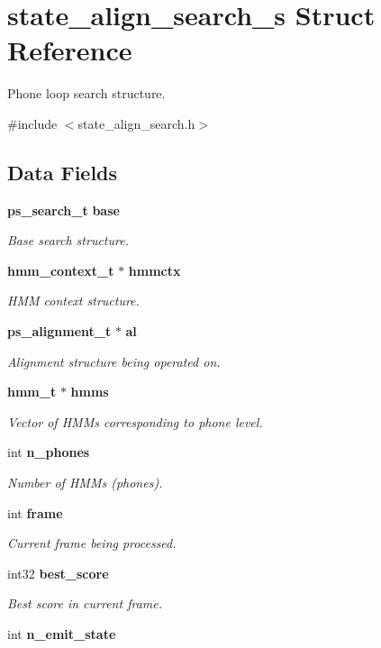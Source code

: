 \section{state\+\_\+align\+\_\+search\+\_\+s Struct Reference}
\label{structstate__align__search__s}


Phone loop search structure.  




{\ttfamily \#include $<$state\+\_\+align\+\_\+search.\+h$>$}

\subsection*{Data Fields}
\begin{DoxyCompactItemize}
\item 
{\bf ps\+\_\+search\+\_\+t} {\bf base}
\begin{DoxyCompactList}\small\item\em Base search structure. \end{DoxyCompactList}\item 
{\bf hmm\+\_\+context\+\_\+t} $\ast$ {\bf hmmctx}
\begin{DoxyCompactList}\small\item\em H\+M\+M context structure. \end{DoxyCompactList}\item 
{\bf ps\+\_\+alignment\+\_\+t} $\ast$ {\bf al}
\begin{DoxyCompactList}\small\item\em Alignment structure being operated on. \end{DoxyCompactList}\item 
{\bf hmm\+\_\+t} $\ast$ {\bf hmms}
\begin{DoxyCompactList}\small\item\em Vector of H\+M\+Ms corresponding to phone level. \end{DoxyCompactList}\item 
int {\bf n\+\_\+phones}
\begin{DoxyCompactList}\small\item\em Number of H\+M\+Ms (phones). \end{DoxyCompactList}\item 
int {\bf frame}
\begin{DoxyCompactList}\small\item\em Current frame being processed. \end{DoxyCompactList}\item 
int32 {\bf best\+\_\+score}
\begin{DoxyCompactList}\small\item\em Best score in current frame. \end{DoxyCompactList}\item 
int {\bf n\+\_\+emit\+\_\+state}\label{structstate__align__search__s_a80c74bac917a8203bb74f5738621ce83}


\end{DoxyCompactItemize}
